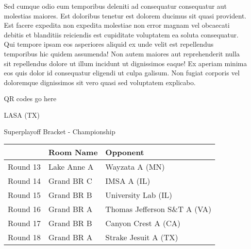 \documentclass{article}%
\begin{document}
\newline%
Sed cumque odio eum temporibus deleniti ad consequatur consequatur aut molestias maiores. Est doloribus tenetur est dolorem ducimus sit quasi provident. Est facere expedita non expedita molestiae non error magnam vel obcaecati debitis et blanditiis reiciendis est cupiditate voluptatem ea soluta consequatur. Qui tempore ipsam eos asperiores aliquid ex unde velit est repellendus temporibus hic quidem assumenda!\newline%
\newline%
Non autem maiores aut reprehenderit nulla sit repellendus dolore ut illum incidunt ut dignissimos eaque! Ex aperiam minima eos quis dolor id consequatur eligendi ut culpa galisum. Non fugiat corporis vel doloremque dignissimos sit vero quasi sed voluptatem explicabo.\newline%
\newline%
%
\vspace*{30pt}%
\begin{center}%
\begin{Huge}%
QR codes go here%
\end{Huge}%
\end{center}%
\newpage%
\begin{center}%
\begin{Huge}%
LASA (TX)%
\end{Huge}%
\vspace*{8pt}%
\linebreak%
\begin{Large}%
Superplayoff Bracket {-} Championship%
\end{Large}%
\end{center}%
%
\begin{tabularx}{\textwidth}{|c|Y|Y|}%
\hline%
&Room Name&Opponent\\%
\hline%
Round 13&Lake Anne A&Wayzata A (MN)\\%
Round 14&Grand BR C&IMSA A (IL)\\%
Round 15&Grand BR B&University Lab (IL)\\%
Round 16&Grand BR A&Thomas Jefferson S\&T A (VA)\\%
Round 17&Grand BR B&Canyon Crest A (CA)\\%
Round 18&Grand BR A&Strake Jesuit A (TX)\\%
\hline%
\end{tabularx}%
\vspace*{8pt}%
\linebreak%
\newline%
\end{document}
